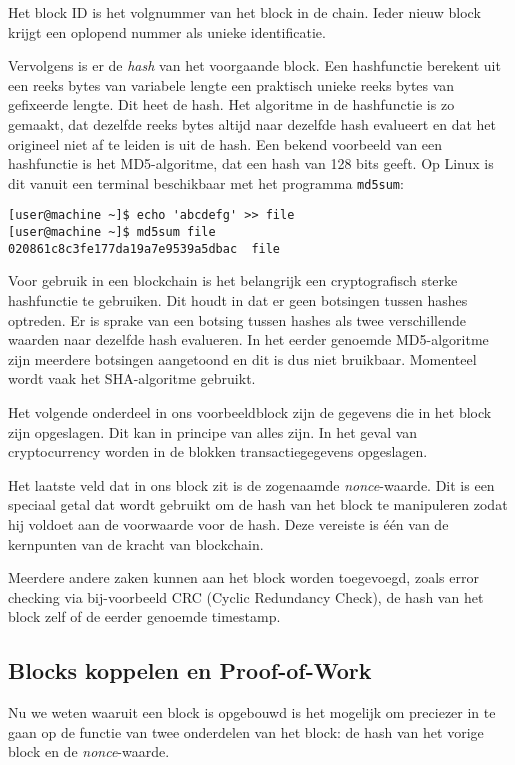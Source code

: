 \documentclass{article}
\begin{document}
Het block ID is het volgnummer van het block in de chain. Ieder nieuw block krijgt een oplopend nummer als unieke identificatie. 

Vervolgens is er de \textit{hash} van het voorgaande block. Een hashfunctie berekent uit een reeks bytes van variabele lengte een praktisch unieke reeks bytes van gefixeerde lengte. Dit heet de hash. Het algoritme in de hashfunctie is zo gemaakt, dat dezelfde reeks bytes altijd naar dezelfde hash evalueert en dat het origineel niet af te leiden is uit de hash. Een bekend voorbeeld van een hashfunctie is het MD5-algoritme, dat een hash van 128 bits geeft. Op Linux is dit vanuit een terminal beschikbaar met het programma \texttt{md5sum}:
\begin{verbatim} 
[user@machine ~]$ echo 'abcdefg' >> file
[user@machine ~]$ md5sum file
020861c8c3fe177da19a7e9539a5dbac  file
\end{verbatim}
Voor gebruik in een blockchain is het belangrijk een cryptografisch sterke hashfunctie te gebruiken. Dit houdt in dat er geen botsingen tussen hashes optreden. Er is sprake van een botsing tussen hashes als twee verschillende waarden naar dezelfde hash evalueren. In het eerder genoemde MD5-algoritme zijn meerdere botsingen aangetoond en dit is dus niet bruikbaar. Momenteel wordt vaak het SHA-algoritme gebruikt.

Het volgende onderdeel in ons voorbeeldblock zijn de gegevens die in het block zijn opgeslagen. Dit kan in principe van alles zijn. In het geval van cryptocurrency worden in de blokken transactiegegevens opgeslagen.

Het laatste veld dat in ons block zit is de zogenaamde \textit{nonce}-waarde. Dit is een speciaal getal dat wordt gebruikt om de hash van het block te manipuleren zodat hij voldoet aan de voorwaarde voor de hash. Deze vereiste is één van de kernpunten van de kracht van blockchain.

Meerdere andere zaken kunnen aan het block worden toegevoegd, zoals error checking via bij-voorbeeld CRC (Cyclic Redundancy Check), de hash van het block zelf of de eerder genoemde timestamp.

\subsection{Blocks koppelen en Proof-of-Work}
Nu we weten waaruit een block is opgebouwd is het mogelijk om preciezer in te gaan op de functie van twee onderdelen van het block: de hash van het vorige block en de \textit{nonce}-waarde.
\end{document}
